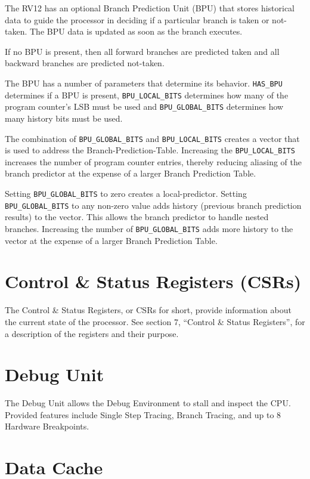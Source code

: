 The RV12 has an optional Branch Prediction Unit (BPU) that stores
historical data to guide the processor in deciding if a particular
branch is taken or not-taken. The BPU data is updated as soon as the
branch executes.

If no BPU is present, then all forward branches are predicted taken and
all backward branches are predicted not-taken.

The BPU has a number of parameters that determine its behavior. \texttt{HAS\_BPU}
determines if a BPU is present, \texttt{BPU\_LOCAL\_BITS} determines how many of
the program counter's LSB must be used and  \texttt{BPU\_GLOBAL\_BITS}  determines
how many history bits must be used.

The combination of \texttt{BPU\_GLOBAL\_BITS} and \texttt{BPU\_LOCAL\_BITS} creates a
vector that is used to address the Branch-Prediction-Table. Increasing
the \texttt{BPU\_LOCAL\_BITS} increases the number of program counter entries,
thereby reducing aliasing of the branch predictor at the expense of a
larger Branch Prediction Table.

Setting \texttt{BPU\_GLOBAL\_BITS} to zero creates a local-predictor. Setting
\texttt{BPU\_GLOBAL\_BITS} to any non-zero value adds history (previous branch
prediction results) to the vector. This allows the branch predictor to
handle nested branches. Increasing the number of \texttt{BPU\_GLOBAL\_BITS} adds
more history to the vector at the expense of a larger Branch Prediction
Table.

\section{Control \& Status Registers (CSRs)} \label{control-status-registers-csrs}

The Control \& Status Registers, or CSRs for short, provide information
about the current state of the processor. See section 7, ``Control \&
Status Registers'', for a description of the registers and their
purpose.

\section{Debug Unit}\label{debug-unit}

The Debug Unit allows the Debug Environment to stall and inspect the
CPU. Provided features include Single Step Tracing, Branch Tracing, and
up to 8 Hardware Breakpoints.

\section{Data Cache}\label{data-cache}

